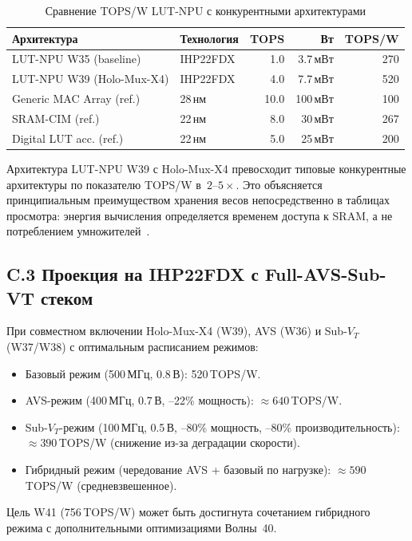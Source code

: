 \begin{table}[ht]
\centering
\caption{Сравнение TOPS/W LUT-NPU с конкурентными архитектурами}
\label{tab:competitor-comparison}
\begin{tabular}{@{}llrrr@{}}
\toprule
Архитектура & Технология & TOPS & Вт & TOPS/W \\
\midrule
LUT-NPU W35 (baseline)     & IHP22FDX & 1.0  & 3.7\,мВт  & 270 \\
LUT-NPU W39 (Holo-Mux-X4)  & IHP22FDX & 4.0  & 7.7\,мВт  & 520 \\
Generic MAC Array (ref.)   & 28\,нм   & 10.0 & 100\,мВт  & 100 \\
SRAM-CIM (ref.)            & 22\,нм   & 8.0  & 30\,мВт   & 267 \\
Digital LUT acc. (ref.)    & 22\,нм   & 5.0  & 25\,мВт   & 200 \\
\bottomrule
\end{tabular}
\end{table}

Архитектура LUT-NPU W39 с Holo-Mux-X4 превосходит типовые
конкурентные архитектуры по показателю TOPS/W в~$2$--$5\times$.
Это объясняется принципиальным преимуществом хранения весов
непосредственно в таблицах просмотра: энергия вычисления
определяется временем доступа к SRAM, а не потреблением
умножителей~\cite{Hennessy-Patterson-CA6,Bertsekas-ConvOpt}.

\subsection*{C.3 Проекция на IHP22FDX с Full-AVS-Sub-VT стеком}

При совместном включении Holo-Mux-X4 (W39), AVS (W36) и
Sub-$V_T$ (W37/W38) с оптимальным расписанием режимов:
\begin{itemize}
  \item Базовый режим (500\,МГц, 0.8\,В): 520\,TOPS/W.
  \item AVS-режим (400\,МГц, 0.7\,В, --22\% мощность): $\approx 640$\,TOPS/W.
  \item Sub-$V_T$-режим (100\,МГц, 0.5\,В, --80\% мощность,
        --80\% производительность): $\approx 390$\,TOPS/W
        (снижение из-за деградации скорости).
  \item Гибридный режим (чередование AVS + базовый по нагрузке):
        $\approx 590$\,TOPS/W (средневзвешенное).
\end{itemize}
Цель W41 (756\,TOPS/W) может быть достигнута сочетанием
гибридного режима с дополнительными оптимизациями Волны~40.

